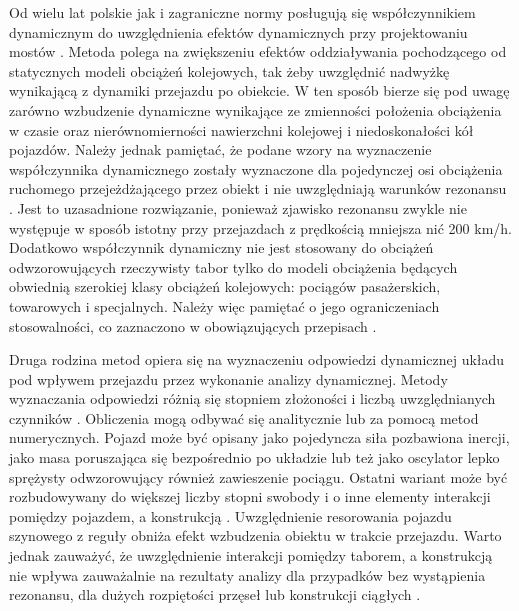 Od wielu lat polskie jak i zagraniczne normy posługują się współczynnikiem dynamicznym do uwzględnienia efektów dynamicznych przy projektowaniu mostów \parencite{Karas2011}. Metoda polega na zwiększeniu efektów oddziaływania pochodzącego od statycznych modeli obciążeń kolejowych, tak żeby uwzględnić nadwyżkę wynikającą z dynamiki przejazdu po obiekcie. W ten sposób bierze się pod uwagę zarówno wzbudzenie dynamiczne wynikające ze zmienności położenia obciążenia w czasie oraz nierównomierności nawierzchni kolejowej i niedoskonałości kół pojazdów. Należy jednak pamiętać, że podane wzory na wyznaczenie współczynnika dynamicznego zostały wyznaczone dla pojedynczej osi obciążenia ruchomego przejeżdżającego przez obiekt i nie uwzględniają warunków rezonansu \parencite{Goicolea2008}. Jest to uzasadnione rozwiązanie, ponieważ zjawisko rezonansu zwykle nie występuje w sposób istotny przy przejazdach z prędkością mniejsza nić 200 km/h. Dodatkowo współczynnik dynamiczny nie jest stosowany do obciążeń odwzorowujących rzeczywisty tabor tylko do modeli obciążenia będących obwiednią szerokiej klasy obciążeń kolejowych: pociągów pasażerskich, towarowych i specjalnych. Należy więc pamiętać o jego ograniczeniach stosowalności, co zaznaczono w obowiązujących przepisach \parencite{PKNj}. 

Druga rodzina metod opiera się na wyznaczeniu odpowiedzi dynamicznej układu pod wpływem przejazdu przez wykonanie analizy dynamicznej. Metody wyznaczania odpowiedzi różnią się stopniem złożoności i liczbą uwzględnianych czynników \parencite{Goicolea2008a}. Obliczenia mogą odbywać się analitycznie lub za pomocą metod numerycznych. Pojazd może być opisany jako pojedyncza siła pozbawiona inercji, jako masa poruszająca się bezpośrednio po układzie lub też jako oscylator lepko sprężysty odwzorowujący również zawieszenie pociągu. Ostatni wariant może być rozbudowywany do większej liczby stopni swobody i o inne elementy interakcji pomiędzy pojazdem, a konstrukcją \parencite{Calcada2008,Szafranski2013,Szafranski2021}. Uwzględnienie resorowania pojazdu szynowego z reguły obniża efekt wzbudzenia obiektu w trakcie przejazdu. Warto jednak zauważyć, że uwzględnienie interakcji pomiędzy taborem, a konstrukcją nie wpływa zauważalnie na rezultaty analizy dla przypadków bez wystąpienia rezonansu, dla dużych rozpiętości przęseł lub konstrukcji ciągłych \parencite{Goicolea2008a}.

